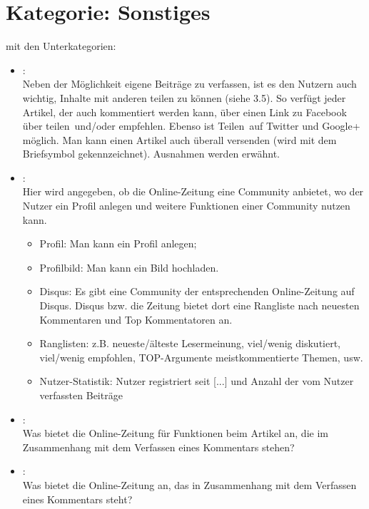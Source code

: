 \section{Kategorie: \glqq Sonstiges\grqq} 

mit den Unterkategorien:
\begin{itemize}[noitemsep]
  \item{}\grqq:\\
    Neben der Möglichkeit eigene Beiträge zu verfassen, ist es den Nutzern auch
    wichtig, Inhalte mit anderen teilen zu können (siehe 3.5). So verfügt jeder
    Artikel, der auch kommentiert werden kann, über einen Link zu Facebook über
    \glqq teilen\grqq\ und/oder \glqq empfehlen\grqq.  Ebenso ist \glqq
    Teilen\grqq\ auf Twitter und Google+ möglich. Man kann einen Artikel auch
    überall versenden (wird mit dem Briefsymbol gekennzeichnet). Ausnahmen
    werden erwähnt.

  \item{}\grqq:\\
    Hier wird angegeben, ob die Online-Zeitung eine Community anbietet, wo der
    Nutzer ein Profil anlegen und weitere Funktionen einer Community nutzen
    kann.
    \begin{itemize}[noitemsep]
      \item Profil: Man kann ein Profil anlegen;
      \item Profilbild: Man kann ein Bild hochladen.
      \item Disqus: Es gibt eine Community der entsprechenden Online-Zeitung auf
        Disqus. Disqus bzw.  die Zeitung bietet dort eine Rangliste nach \glqq
        neuesten Kommentaren\grqq{} und  \glqq Top Kommentatoren\grqq{} an.
      \item Ranglisten: z.B. neueste/älteste Lesermeinung, viel/wenig
        diskutiert, viel/wenig empfohlen, TOP-Argumente meistkommentierte
        Themen, usw.
      \item Nutzer-Statistik: Nutzer registriert seit [...] und
        Anzahl der vom Nutzer verfassten Beiträge
    \end{itemize}

  \item{}\grqq:\\
    Was bietet die Online-Zeitung für Funktionen beim Artikel an, die im
    Zusammenhang mit dem Verfassen eines Kommentars stehen?

  \item{}\grqq:\\
    Was bietet die Online-Zeitung an, das in Zusammenhang mit dem Verfassen
    eines Kommentars steht?
\end{itemize}


